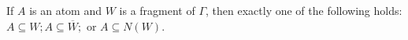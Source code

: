 If $A$ is an atom and $W$ is a fragment of $\Gamma$, then exactly one of the following holds: $A \subseteq W; A \subseteq \overline{W};$ or $A \subseteq N(W)$.
